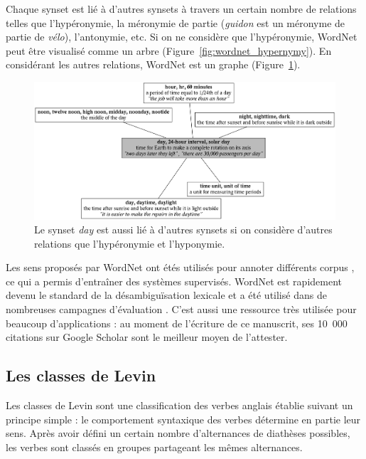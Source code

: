 Chaque synset est lié à d'autres synsets à travers un certain nombre de
relations telles que l'hypéronymie, la méronymie de partie (\emph{guidon} est
un méronyme de partie de \emph{vélo}), l'antonymie, etc. Si on ne considère que
l'hypéronymie, WordNet peut être visualisé comme un arbre
(Figure~\ref{fig:wordnet_hypernymy}). En considérant les autres relations,
WordNet est un graphe (Figure~\ref{fig:wordnet_relations}).

\begin{figure}
    \centering
    \includegraphics[width=\textwidth]{fig/wordnet_relations.png}
    \caption{\label{fig:wordnet_relations} Le synset \emph{day} est aussi lié à
        d'autres synsets si on considère d'autres relations que l'hypéronymie et
        l'hyponymie.}
\end{figure}

Les sens proposés par WordNet ont étés utilisés pour annoter différents corpus
\citep{petrolito2014survey}, ce qui a permis d'entraîner des systèmes
supervisés. WordNet est rapidement devenu le standard de la désambiguïsation
lexicale et a été utilisé dans de nombreuses campagnes d'évaluation
\citep{navigli2009word}. C'est aussi une ressource très utilisée pour beaucoup
d'applications : au moment de l'écriture de ce manuscrit, ses 10~000 citations
sur Google Scholar sont le meilleur moyen de l'attester.

\subsection{Les classes de Levin}
\label{presentation_levin}

Les classes de Levin \citep{levin1993english} sont une classification des
verbes anglais établie suivant un principe simple : le comportement syntaxique
des verbes détermine en partie leur sens. Après avoir défini un certain nombre
d'alternances de diathèses possibles, les verbes sont classés en groupes
partageant les mêmes alternances.

